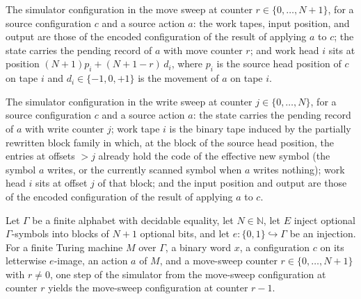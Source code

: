\begin{definition}
\label{Turing.FinTM.arMoveCfg}
\leanok
{}
The simulator configuration in the move sweep at counter $r \in \{0,\dots,N+1\}$, for a
source configuration $c$ and a source action $a$: the work tapes, input position, and
output are those of the encoded configuration of the result of applying $a$ to $c$; the
state carries the pending record of $a$ with move counter $r$; and work head $i$ sits
at position $(N+1)p_i + (N+1-r)\,d_i$, where $p_i$ is the source head position of $c$
on tape $i$ and $d_i \in \{-1,0,+1\}$ is the movement of $a$ on tape $i$.
\end{definition}

\begin{definition}
\label{Turing.FinTM.arWriteCfg}
\leanok
{}
The simulator configuration in the write sweep at counter $j \in \{0,\dots,N\}$, for a
source configuration $c$ and a source action $a$: the state carries the pending record
of $a$ with write counter $j$; work tape $i$ is the binary tape induced by the
partially rewritten block family in which, at the block of the source head position,
the entries at offsets $> j$ already hold the code of the effective new symbol (the
symbol $a$ writes, or the currently scanned symbol when $a$ writes nothing); work head
$i$ sits at offset $j$ of that block; and the input position and output are those of
the encoded configuration of the result of applying $a$ to $c$.
\end{definition}

\begin{lemma}
\label{Turing.FinTM.arMoveCfg_step}
\leanok
{}
Let $\Gamma$ be a finite alphabet with decidable equality, let $N\in\mathbb{N}$, let $E$
inject optional $\Gamma$-symbols into blocks of $N+1$ optional bits, and let
$e:\{0,1\}\hookrightarrow\Gamma$ be an injection. For a finite Turing machine $M$ over
$\Gamma$, a binary word $x$, a configuration $c$ on its letterwise $e$-image, an action
$a$ of $M$, and a move-sweep counter $r\in\{0,\ldots,N+1\}$ with $r\ne0$, one step of
the simulator from the move-sweep configuration at counter $r$ yields the move-sweep
configuration at counter $r-1$.
\end{lemma}

